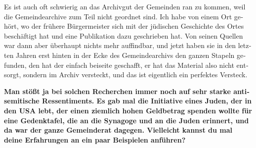 \begin{otherlanguage}{ngerman}
Es ist auch oft schwierig an das Archivgut der Gemeinden ran zu kommen, weil die Gemeindearchive zum Teil nicht geordnet sind. Ich habe von einem Ort gehört, wo der frühere Bürgermeister sich mit der jüdischen Geschichte des Ortes beschäftigt hat und eine Publikation dazu geschrieben hat. Von seinen Quellen war dann aber überhaupt nichts mehr auffindbar, und jetzt haben sie in den letzten Jahren erst hinten in der Ecke des Gemeindearchivs den ganzen Stapeln gefunden, den hat der einfach beiseite geschafft, er hat das Material also nicht entsorgt, sondern im Archiv versteckt, und das ist eigentlich ein perfektes Versteck. 

\textbf{Man stößt ja bei solchen Recherchen immer noch auf sehr starke antisemitische Ressentiments.  
Es gab mal die Initiative eines Juden, der in den USA lebt, der einen ziemlich hohen Geldbetrag spenden wollte für eine Gedenktafel, die an die Synagoge und an die Juden erinnert, und da war der ganze Gemeinderat dagegen. Vielleicht kannst du mal deine Erfahrungen an ein paar Beispielen anführen?} 


\end{otherlanguage}
